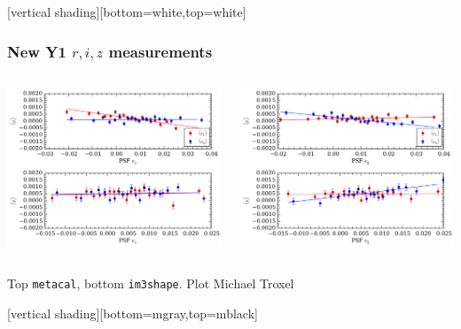 \documentclass{beamer}
\begin{document}
{
    [vertical shading][bottom=white,top=white]
    \frame
    {
        \frametitle{New Y1 $r,i,z$ measurements}

        \begin{columns}
            \begin{column}{0.5\textwidth}
                \begin{center}
                    \includegraphics[width=\textwidth]{lin_split_psf1.pdf}
                \end{center}
            \end{column}
            \begin{column}{0.5\textwidth}
                \begin{center}
                    \includegraphics[width=\textwidth]{lin_split_psf2.pdf}
                \end{center}
            \end{column}

        \end{columns}

        \vspace{5mm}
        Top \texttt{metacal}, bottom \texttt{im3shape}. Plot Michael Troxel


    }
    [vertical shading][bottom=mgray,top=mblack]
}
\end{document}
